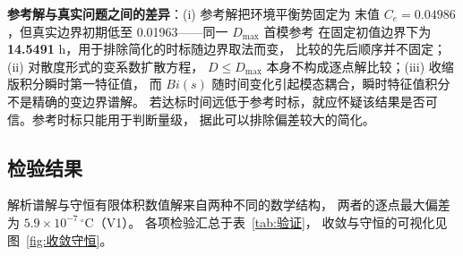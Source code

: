 \documentclass[12pt,a4paper]{ctexart}
\numberwithin{equation}{section}
\begin{document}
\textbf{参考解与真实问题之间的差异}：(i) 参考解把环境平衡势固定为
末值 $C_e=0.04986$，但真实边界初期低至 0.01963——同一 $D_{\max}$ 首模参考
在固定初值边界下为 \textbf{14.5491} h，用于排除简化的时标随边界取法而变，
比较的先后顺序并不固定；(ii) 对散度形式的变系数扩散方程，
$D\le D_{\max}$ 本身不构成逐点解比较；(iii) 收缩版积分瞬时第一特征值，
而 $Bi(s)$ 随时间变化引起模态耦合，瞬时特征值积分不是精确的变边界谱解。
若达标时间远低于参考时标，就应怀疑该结果是否可信。参考时标只能用于判断量级，
据此可以排除偏差较大的简化。

\subsection{检验结果}
解析谱解与守恒有限体积数值解来自两种不同的数学结构，
两者的逐点最大偏差为 $5.9\times10^{-7}\,^{\circ}$C（V1）。
各项检验汇总于表~\ref{tab:验证}，
收敛与守恒的可视化见图~\ref{fig:收敛守恒}。
\end{document}
